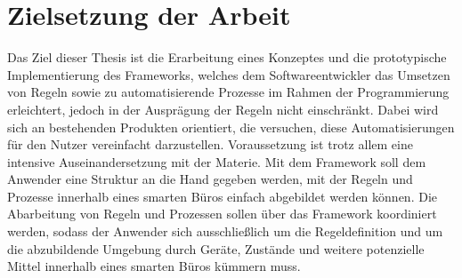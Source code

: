 \section{Zielsetzung der Arbeit}
\label{sec:zielsetzung}
    Das Ziel dieser Thesis ist die Erarbeitung eines Konzeptes und die prototypische Implementierung des Frameworks, welches dem Softwareentwickler das 
    Umsetzen von Regeln sowie zu automatisierende Prozesse im Rahmen der Programmierung erleichtert, jedoch in der Ausprägung 
    der Regeln nicht einschränkt. Dabei wird sich an bestehenden Produkten orientiert, die versuchen, diese 
    Automatisierungen für den Nutzer vereinfacht darzustellen. Voraussetzung ist trotz allem eine intensive Auseinandersetzung mit der Materie. 
    Mit dem Framework soll dem Anwender eine Struktur an die Hand gegeben werden, mit der Regeln und Prozesse innerhalb eines 
    smarten Büros einfach abgebildet werden können. Die Abarbeitung von Regeln und Prozessen sollen über das Framework 
    koordiniert werden, sodass der Anwender sich ausschließlich um die Regeldefinition und um die abzubildende Umgebung durch Geräte, Zustände und weitere 
    potenzielle Mittel innerhalb eines smarten Büros kümmern muss. 





